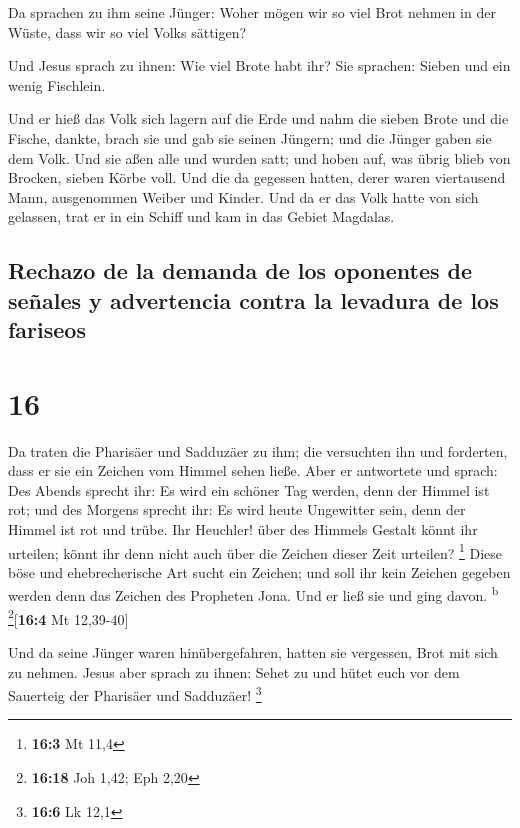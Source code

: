  Da sprachen zu ihm seine Jünger: Woher mögen wir so viel
Brot nehmen in der Wüste, dass wir so viel Volks sättigen?

 Und Jesus sprach zu ihnen: Wie viel Brote habt ihr? Sie
sprachen: Sieben und ein wenig Fischlein.

 Und er hieß das Volk sich lagern auf die Erde
 und nahm die sieben Brote und die Fische, dankte, brach
sie und gab sie seinen Jüngern; und die Jünger gaben sie dem Volk.
 Und sie aßen alle und wurden satt; und hoben auf, was
übrig blieb von Brocken, sieben Körbe voll.  Und die da
gegessen hatten, derer waren viertausend Mann, ausgenommen Weiber und
Kinder.  Und da er das Volk hatte von sich gelassen, trat
er in ein Schiff und kam in das Gebiet Magdalas.

\hypertarget{rechazo-de-la-demanda-de-los-oponentes-de-seuxf1ales-y-advertencia-contra-la-levadura-de-los-fariseos}{%
\subsection{Rechazo de la demanda de los oponentes de señales y
advertencia contra la levadura de los
fariseos}\label{rechazo-de-la-demanda-de-los-oponentes-de-seuxf1ales-y-advertencia-contra-la-levadura-de-los-fariseos}}

\hypertarget{section-15}{%
\section{16}\label{section-15}}

 Da traten die Pharisäer und Sadduzäer zu ihm; die
versuchten ihn und forderten, dass er sie ein Zeichen vom Himmel sehen
ließe.  Aber er antwortete und sprach: Des Abends sprecht
ihr: Es wird ein schöner Tag werden, denn der Himmel ist rot;
 und des Morgens sprecht ihr: Es wird heute Ungewitter
sein, denn der Himmel ist rot und trübe. Ihr Heuchler! über des Himmels
Gestalt könnt ihr urteilen; könnt ihr denn nicht auch über die Zeichen
dieser Zeit urteilen? \footnote{\textbf{16:3} Mt 11,4} 
Diese böse und ehebrecherische Art sucht ein Zeichen; und soll ihr kein
Zeichen gegeben werden denn das Zeichen des Propheten Jona. Und er ließ
sie und ging davon. \textsuperscript{b} \footnote{\textbf{16:18} Joh
  1,42; Eph 2,20}{[}\textbf{16:4} Mt 12,39-40{]}

 Und da seine Jünger waren hinübergefahren, hatten sie
vergessen, Brot mit sich zu nehmen.  Jesus aber sprach zu
ihnen: Sehet zu und hütet euch vor dem Sauerteig der Pharisäer und
Sadduzäer! \footnote{\textbf{16:6} Lk 12,1}

